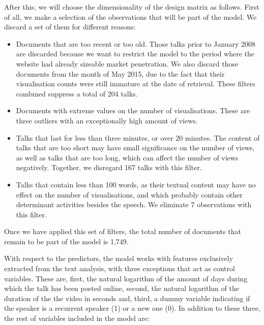 \documentclass[a4paper, 11pt]{article} %
\begin{document}
After this, we will choose the dimensionality of the design matrix as follows. First of all, we make a selection of the observations that will be part of the model. We discard a set of them for different reasons:

\begin{itemize}
\item Documents that are too recent or too old. Those talks prior to January 2008 are discarded because we want to restrict the model to the period where the website had already sizeable market penetration. We also discard those documents from the month of May 2015, due to the fact that their visualisation counts were still immature at the date of retrieval. These filters combined suppress a total of 204 talks.
\item Documents with extreme values on the number of visualisations. These are three outliers with an exceptionally high amount of views.
\item Talks that last for less than three minutes, or over 20 minutes. The content of talks that are too short may have small significance on the number of views, as well as talks that are too long, which can affect the number of views negatively. Together, we disregard 167 talks with this filter.
\item Talks that contain less than 100 words, as their textual content may have no effect on the number of visualisations, and which probably contain other determinant activities besides the speech. We eliminate 7 observations with this filter.
\end{itemize}

Once we have applied this set of  filters, the total number of documents that remain to be part of the model is 1,749.

With respect to the predictors, the model works with features exclusively extracted from the text analysis, with three exceptions that act as control variables. These are, first, the natural logarithm of the amount of days during which the talk has been posted online, second, the natural logarithm of the duration of the the video in seconds and, third, a dummy variable indicating if the speaker is a recurrent speaker (1) or a new one (0). In addition to these three, the rest of variables included in the model are:
\end{document}
